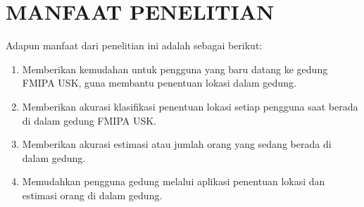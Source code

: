 \section{\uppercase{manfaat penelitian}}
Adapun manfaat dari penelitian ini adalah sebagai berikut:
\begin{enumerate}
	\item Memberikan kemudahan untuk pengguna yang baru datang ke gedung FMIPA USK, guna membantu penentuan lokasi dalam gedung.
	\item Memberikan akurasi klasifikasi penentuan lokasi setiap pengguna saat berada di dalam gedung FMIPA USK.
	\item Memberikan akurasi estimasi atau jumlah orang yang sedang berada di dalam gedung.
	\item Memudahkan pengguna gedung melalui aplikasi penentuan lokasi dan estimasi orang di dalam gedung.


\end{enumerate}
\begin{comment}

\end{comment}